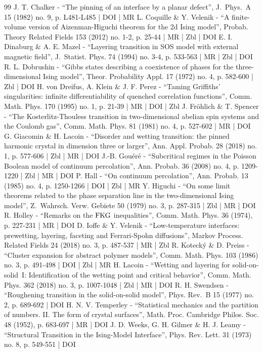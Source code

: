 \begin{thebibliography}{99}
J. T. Chalker - “The pinning of an interface by a planar defect”, J. Phys. A 15 (1982) no. 9, p. L481-L485 | DOI | MR
L. Coquille \& Y. Velenik - “A finite-volume version of Aizenman-Higuchi theorem for the 2d Ising model”, Probab. Theory Related Fields 153 (2012) no. 1-2, p. 25-44 | MR | Zbl | DOI
E. I. Dinaburg \& A. E. Mazel - “Layering transition in SOS model with external magnetic field”, J. Statist. Phys. 74 (1994) no. 3-4, p. 533-563 | MR | Zbl | DOI
R. L. Dobrushin - “Gibbs states describing a coexistence of phases for the three-dimensional Ising model”, Theor. Probability Appl. 17 (1972) no. 4, p. 582-600 | Zbl | DOI
H. von Dreifus, A. Klein \& J. F. Perez - “Taming Griffiths’ singularities: infinite differentiability of quenched correlation functions”, Comm. Math. Phys. 170 (1995) no. 1, p. 21-39 | MR | DOI | Zbl
J. Fröhlich \& T. Spencer - “The Kosterlitz-Thouless transition in two-dimensional abelian spin systems and the Coulomb gas”, Comm. Math. Phys. 81 (1981) no. 4, p. 527-602 | MR | DOI
G. Giacomin \& H. Lacoin - “Disorder and wetting transition: the pinned harmonic crystal in dimension three or larger”, Ann. Appl. Probab. 28 (2018) no. 1, p. 577-606 | Zbl | MR | DOI
J.-B. Gouéré - “Subcritical regimes in the Poisson Boolean model of continuum percolation”, Ann. Probab. 36 (2008) no. 4, p. 1209-1220 | Zbl | MR | DOI
P. Hall - “On continuum percolation”, Ann. Probab. 13 (1985) no. 4, p. 1250-1266 | DOI | Zbl | MR
Y. Higuchi - “On some limit theorems related to the phase separation line in the two-dimensional Ising model”, Z. Wahrsch. Verw. Gebiete 50 (1979) no. 3, p. 287-315 | Zbl | MR | DOI
R. Holley - “Remarks on the ${\rm FKG}$ inequalities”, Comm. Math. Phys. 36 (1974), p. 227-231 | MR | DOI
D. Ioffe \& Y. Velenik - “Low-temperature interfaces: prewetting, layering, faceting and Ferrari-Spohn diffusions”, Markov Process. Related Fields 24 (2018) no. 3, p. 487-537 | MR | Zbl
R. Kotecký \& D. Preiss - “Cluster expansion for abstract polymer models”, Comm. Math. Phys. 103 (1986) no. 3, p. 491-498 | DOI | Zbl | MR
H. Lacoin - “Wetting and layering for solid-on-solid I: Identification of the wetting point and critical behavior”, Comm. Math. Phys. 362 (2018) no. 3, p. 1007-1048 | Zbl | MR | DOI
R. H. Swendsen - “Roughening transition in the solid-on-solid model”, Phys. Rev. B 15 (1977) no. 2, p. 689-692 | DOI
H. N. V. Temperley - “Statistical mechanics and the partition of numbers. II. The form of crystal surfaces”, Math. Proc. Cambridge Philos. Soc. 48 (1952), p. 683-697 | MR | DOI
J. D. Weeks, G. H. Gilmer \& H. J. Leamy - “Structural Transition in the Ising-Model Interface”, Phys. Rev. Lett. 31 (1973) no. 8, p. 549-551 | DOI
\end{thebibliography}
